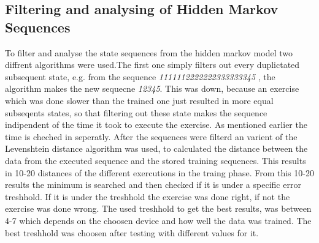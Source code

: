 \subsection{Filtering and analysing of Hidden Markov Sequences}

To filter and analyse the state sequences from the hidden markov model two diffrent algorithms were used.The first one simply filters out every  duplictated subsequent state, e.g. from the sequence \textit{\small1111112222222333333345} , the algorithm makes the new sequecne \textit{\small12345}. This was down, because an exercise which was done slower than the trained one just resulted in more equal subseqents states, so that filtering out these state makes the sequence indipendent of the time it took to execute the exercise. As mentioned earlier the time is cheched in seperatly.
\newline
\newline
After the sequences were filterd an varient of the Levenshtein distance algorithm was used, to calculated the distance between the data from the executed sequence and the stored training sequences. This results in 10-20 distances of the different exercutions in the traing phase. From this 10-20 results the minimum is searched and then checked if it is under a specific error treshhold. If it is under the treshhold the exercise was done right, if not the exercise was done wrong. The used treshhold to get the best results, was between 4-7 which depends on the choosen device and how well the data was trained. The best treshhold was choosen after testing with different values for it.
